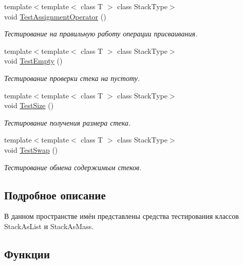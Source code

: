 \begin{DoxyCompactItemize}
{\footnotesize template$<$template$<$ class T $>$ class Stack\+Type$>$ }\\void \hyperlink{namespacestk__test_a3ba77d093637ee2f396e752cea61aee0}{Test\+Assignment\+Operator} ()
\begin{DoxyCompactList}\small\item\em Тестирование на правильную работу операции присваивания. \end{DoxyCompactList}\item 
{\footnotesize template$<$template$<$ class T $>$ class Stack\+Type$>$ }\\void \hyperlink{namespacestk__test_a7c74f2910436ae4560d47bd088fa414c}{Test\+Empty} ()
\begin{DoxyCompactList}\small\item\em Тестирование проверки стека на пустоту. \end{DoxyCompactList}\item 
{\footnotesize template$<$template$<$ class T $>$ class Stack\+Type$>$ }\\void \hyperlink{namespacestk__test_a24faf9dd70ba3d62af3a455dd9437090}{Test\+Size} ()
\begin{DoxyCompactList}\small\item\em Тестирование получения размера стека. \end{DoxyCompactList}\item 
{\footnotesize template$<$template$<$ class T $>$ class Stack\+Type$>$ }\\void \hyperlink{namespacestk__test_af617996279c5a7955ab644d545de7efc}{Test\+Swap} ()
\begin{DoxyCompactList}\small\item\em Тестирование обмена содержимым стеков. \end{DoxyCompactList}\end{DoxyCompactItemize}


\subsection{Подробное описание}
В данном пространстве имён представлены средства тестирования классов Stack\+As\+List и Stack\+As\+Mass. 

\subsection{Функции}
\hypertarget{namespacestk__test_a3ba77d093637ee2f396e752cea61aee0}{}
